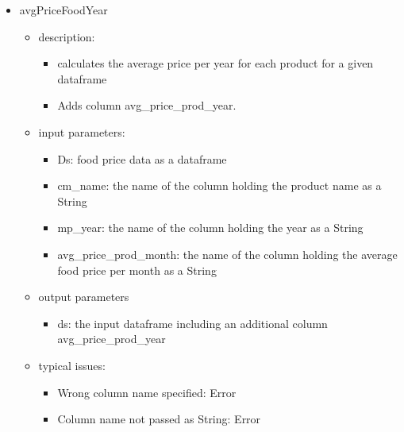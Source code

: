\documentclass[11pt]{article}
\begin{document}
\begin{itemize}
\item avgPriceFoodYear
	\begin{itemize}
	\item description: 
		\begin{itemize}
		\item calculates the average price per year for each product for a given dataframe 
		\item Adds column avg\_price\_prod\_year.
		\end{itemize}
	\item input parameters: 
		\begin{itemize}
		\item Ds: food price data as a dataframe 
		\item cm\_name: the name of the column holding the product name as a String        
		\item mp\_year: the name of the column holding the year as a String      
		\item avg\_price\_prod\_month: the name of the column holding the average food price per month as a String 
		\end{itemize}
	\item output parameters
		\begin{itemize}
		\item ds: the input dataframe including an additional column avg\_price\_prod\_year
		\end{itemize}
	\item typical issues:
		\begin{itemize}
		\item Wrong column name specified: Error
		\item Column name not passed as String: Error
		\end{itemize}
	\end{itemize}


\end{itemize}
\end{document}
